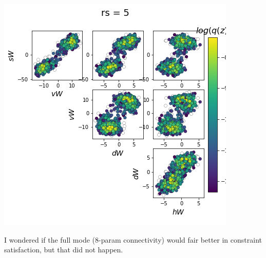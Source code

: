 \documentclass[11pt]{article}
\begin{document}
\begin{center}
\includegraphics[scale=0.33]{figs/Z_SC_reduced_c=0_p=50_rs=5.png}
\end{center}

I wondered if the full mode (8-param connectivity) would fair better in constraint satisfaction, but that did not happen.
\end{document}
